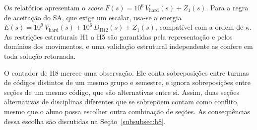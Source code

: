 Os relatórios apresentam o \textit{score} $F(s)=10^6\,V_{\mathrm{hard}}(s)+Z_1(s)$. Para a regra de aceitação do SA, que exige um escalar, usa-se a energia $E(s)=10^9\,V_{\mathrm{hard}}(s)+10^6\,D_{\mathrm{H12}}(s)+Z_1(s)$, compatível com a ordem de $\kappa$. As restrições estruturais H1 a H5 são garantidas pela representação e pelos domínios dos movimentos, e uma validação estrutural independente as confere em toda solução retornada.

O contador de H8 merece uma observação. Ele conta sobreposições entre turmas de códigos distintos de um mesmo grupo e semestre, e ignora sobreposições entre seções de um mesmo código, que são alternativas entre si. Assim, duas seções alternativas de disciplinas diferentes que se sobrepõem contam como conflito, mesmo que o aluno possa escolher outra combinação de seções. As consequências dessa escolha são discutidas na Seção~\ref{subsubsec:h8}.

